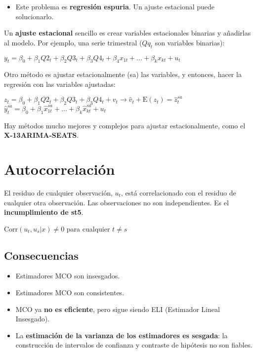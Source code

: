 \documentclass[10pt, a4paper, landscape]{extarticle}
\newcommand{\E}{\mathrm{E}}
\newcommand{\Corr}{\mathrm{Corr}}
\begin{document}
\begin{multicols}{3}
\begin{multicols}{2}
		\end{multicols}
		\begin{itemize}[leftmargin=*]
			\item Este problema es \textbf{regresión espuria}. Un ajuste estacional puede solucionarlo.
		\end{itemize}
		Un \textbf{ajuste estacional} sencillo es crear variables estacionales binarias y añadirlas al modelo. Por ejemplo, una serie trimestral ($Qq_t$ son variables binarias):
		\begin{center}
			$y_t = \beta_0 + \beta_1 Q2_t + \beta_2 Q3_t + \beta_3 Q4_t + \beta_4 x_{1t} + ... + \beta_k x_{kt} + u_t$
		\end{center}
		Otro método es ajustar estacionalmente (sa) las variables, y entonces, hacer la regresión con las variables ajustadas:
		\begin{center}
			$z_t = \beta_0 + \beta_1 Q2_t + \beta_2 Q3_t + \beta_3 Q4_t  + v_t \rightarrow \hat{v}_t + \E(z_t) = \hat{z}_t^{sa}$
			$\hat{y}_t^{sa} = \beta_0 + \beta_1 \hat{x}_{1t}^{sa} + ... + \beta_k \hat{x}_{kt}^{sa} + u_t$
		\end{center}
		Hay métodos mucho mejores y complejos para ajustar estacionalmente, como el \textbf{X-13ARIMA-SEATS}.
\columnbreak
\section*{Autocorrelación}
	El residuo de cualquier observación, $u_t$, está correlacionado con el residuo de cualquier otra observación. Las observaciones no son independientes. Es el \textbf{incumplimiento de st5}.
	\begin{center}
		$\Corr(u_t, u_s | x) \neq 0$ para cualquier $t \neq s$
	\end{center}
	\subsection*{Consecuencias}
		\begin{itemize}[leftmargin=*]
			\item Estimadores MCO son insesgados.
			\item Estimadores MCO son consistentes.
			\item MCO ya \textbf{no es eficiente}, pero sigue siendo ELI (Estimador Lineal Insesgado).
			\item La \textbf{estimación de la varianza de los estimadores es sesgada}: la construcción de intervalos de confianza y contraste de hipótesis no son fiables.
		\end{itemize}

\end{multicols}
\end{document}
